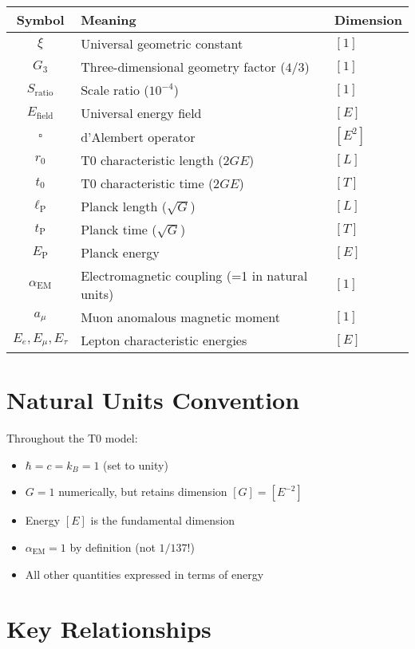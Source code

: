 \documentclass[12pt,a4paper]{report}
\newcommand{\EP}{E_{\text{P}}}            %
\newcommand{\lP}{\ell_{\text{P}}}         %
\newcommand{\tP}{t_{\text{P}}}            %
\newcommand{\rzero}{r_0}                  %
\newcommand{\tzero}{t_0}                  %
\begin{document}
\begin{longtable}{|c|l|l|}
	\hline
	\textbf{Symbol} & \textbf{Meaning} & \textbf{Dimension} \\
	\hline
	$\xi$ & Universal geometric constant & $[1]$ \\
	$G_3$ & Three-dimensional geometry factor ($4/3$) & $[1]$ \\
	$S_{\text{ratio}}$ & Scale ratio ($10^{-4}$) & $[1]$ \\
	$E_{\text{field}}$ & Universal energy field & $[E]$ \\
	$\square$ & d'Alembert operator & $[E^2]$ \\
	$\rzero$ & T0 characteristic length ($2GE$) & $[L]$ \\
	$\tzero$ & T0 characteristic time ($2GE$) & $[T]$ \\
	$\lP$ & Planck length ($\sqrt{G}$) & $[L]$ \\
	$\tP$ & Planck time ($\sqrt{G}$) & $[T]$ \\
	$\EP$ & Planck energy & $[E]$ \\
	$\alpha_{\text{EM}}$ & Electromagnetic coupling (=1 in natural units) & $[1]$ \\
	$a_\mu$ & Muon anomalous magnetic moment & $[1]$ \\
	$E_e, E_\mu, E_\tau$ & Lepton characteristic energies & $[E]$ \\
	\hline
\end{longtable}

\section{Natural Units Convention}
\label{sec:natural_units_convention}

Throughout the T0 model:
\begin{itemize}
	\item $\hbar = c = k_B = 1$ (set to unity)
	\item $G = 1$ numerically, but retains dimension $[G] = [E^{-2}]$
	\item Energy $[E]$ is the fundamental dimension
	\item $\alpha_{\text{EM}} = 1$ by definition (not $1/137$!)
	\item All other quantities expressed in terms of energy
\end{itemize}

\section{Key Relationships}
\label{sec:key_relationships}
\end{document}

